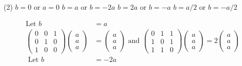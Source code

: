 \begin{enumerate}[label=\color{ocre}\textbf{\arabic*.}]
	{}
	\begin{tasks}(2)
		\task[\textbf{A.}] $b=0$ or $a=0$
		\task[\textbf{B.}] $b=a$ or $b=-2 a$
		\task[\textbf{C.}] $b=2 a$ or $b=-a$
		\task[\textbf{D.}] $b=a / 2$ or $b=-a / 2$
	\end{tasks}
	\begin{answer}
		\begin{align*}
		\text{Let }b&=a\\
		\left(\begin{array}{lll}0 & 0 & 1 \\ 0 & 1 & 0 \\ 1 & 0 & 0\end{array}\right)\left(\begin{array}{l}a \\ a \\ a\end{array}\right)&=\left(\begin{array}{l}a \\ a \\ a\end{array}\right)\text{ and } \left(\begin{array}{lll}0 & 1 & 1 \\ 1 & 0 & 1 \\ 1 & 1 & 0\end{array}\right)\left(\begin{array}{l}a \\ a \\ a\end{array}\right)=2\left(\begin{array}{l}a \\ a \\ a\end{array}\right)\\
		\text{	Let }b&=-2 a\\

\end{align*}
\end{answer}
\end{enumerate}
